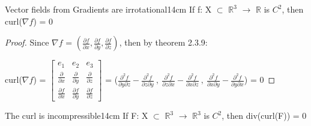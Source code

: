     \vspace{0.5cm}



    \begin{wtheorem}{Vector fields from Gradients are irrotational}{14cm}
        If f: X $\subset$ $\mathbb{R}^3$ $\rightarrow$ $\mathbb{R}$
        is $C^2$, then curl($\nabla f$) = 0
    \end{wtheorem}

    \begin{proof}
        Since $\nabla f$
        = $(\frac{\partial f}{\partial x},
            \frac{\partial f}{\partial y},
            \frac{\partial f}{\partial z})$,
        then by {\color{red} theorem 2.3.9}:

        \hspace{0.5cm}
        curl($\nabla f$) =
        $
        \begin{bmatrix}
            e_1 & e_2 & e_3 \\
            \frac{\partial}{\partial x} & \frac{\partial}{\partial y}
                & \frac{\partial}{\partial z} \\
            \frac{\partial f}{\partial x} & \frac{\partial f}{\partial y}
                & \frac{\partial f}{\partial z}
        \end{bmatrix}
        $
        = ($\frac{\partial^2 f}{\partial y\partial z}
                - \frac{\partial^2 f}{\partial z\partial y} \ , \
            \frac{\partial^2 f}{\partial z\partial x}
                - \frac{\partial^2 f}{\partial x\partial z} \ , \
            \frac{\partial^2 f}{\partial x\partial y}
                - \frac{\partial^2 f}{\partial y\partial x}$)
        = 0
    \end{proof}

    \vspace{0.5cm}



    \begin{wtheorem}{The curl is incompressible}{14cm}
        If F: X $\subset$ $\mathbb{R}^3$ $\rightarrow$ $\mathbb{R}^3$
        is $C^2$, then div(curl(F)) = 0
    \end{wtheorem}

